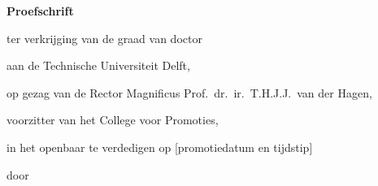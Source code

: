 \begin{titlepage}

\begin{center}

\vspace*{2\bigskipamount}

{\makeatletter
\titlestyle\bfseries\LARGE\@title
\makeatother}

{\makeatletter
\ifx\@subtitle\undefined\else
    \bigskip
    \titlefont\titleshape\Large\@subtitle
\fi
\makeatother}

\end{center}

\cleardoublepage
\thispagestyle{empty}

\begin{center}


\vspace*{2\bigskipamount}

{\makeatletter
\titlestyle\bfseries\LARGE\@title
\makeatother}

{\makeatletter
\ifx\@subtitle\undefined\else
    \bigskip
    \titlefont\titleshape\Large\@subtitle
\fi
\makeatother}

\vfill


{\Large\titlefont\bfseries Proefschrift}

\bigskip
\bigskip

ter verkrijging van de graad van doctor

aan de Technische Universiteit Delft,

op gezag van de Rector Magnificus Prof.~dr.~ir.~T.H.J.J.~van der Hagen,

voorzitter van het College voor Promoties,

in het openbaar te verdedigen op [promotiedatum en tijdstip]

\bigskip
\bigskip

door

\bigskip
\bigskip

\makeatletter
{\Large\titlefont\bfseries\@firstname\ {\titleshape\@lastname}}
\makeatother


\end{center}
\end{titlepage}
